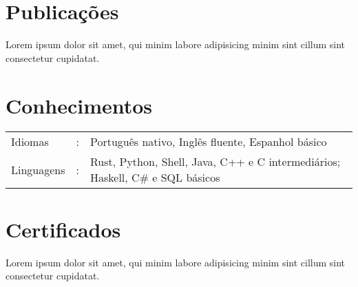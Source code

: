 \documentclass[11pt]{article}
\begin{document}
\section*{Publicações}

Lorem ipsum dolor sit amet, qui minim labore adipisicing minim sint cillum sint consectetur cupidatat.

\section*{Conhecimentos}

\begin{tabular}{ l@{} c l }
	Idiomas &:&Português nativo, Inglês fluente, Espanhol básico\\
	Linguagens &:&Rust, Python, Shell, Java, C++ e C intermediários; Haskell, C\# e SQL básicos\\
\end{tabular}

\section*{Certificados}

Lorem ipsum dolor sit amet, qui minim labore adipisicing minim sint cillum sint consectetur cupidatat.
\end{document}
